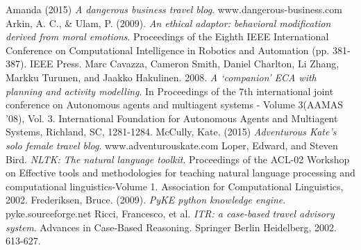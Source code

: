 \documentclass[11pt]{article} %
\begin{document}
\begin{thebibliography}{9}

Amanda (2015) \emph{A dangerous business travel blog}. www.dangerous-business.com
Arkin, A. C., \& Ulam, P. (2009). \emph{An ethical adaptor: behavioral modification derived from moral emotions}. Proceedings of the Eighth IEEE International Conference on Computational Intelligence in Robotics and Automation (pp. 381-387). IEEE Press.
Marc Cavazza, Cameron Smith, Daniel Charlton, Li Zhang, Markku Turunen, and Jaakko Hakulinen. 2008. \emph{A `companion' ECA with planning and activity modelling}. In Proceedings of the 7th international joint conference on Autonomous agents and multiagent systems - Volume 3(AAMAS '08), Vol. 3. International Foundation for Autonomous Agents and Multiagent Systems, Richland, SC, 1281-1284.
McCully, Kate. (2015) \emph{Adventurous Kate's solo female travel blog}. www.adventurouskate.com
Loper, Edward, and Steven Bird. \emph{NLTK: The natural language toolkit}. Proceedings of the ACL-02 Workshop on Effective tools and methodologies for teaching natural language processing and computational linguistics-Volume 1. Association for Computational Linguistics, 2002.
Frederiksen, Bruce. (2009). \emph{PyKE python knowledge engine}. pyke.sourceforge.net
Ricci, Francesco, et al. \emph{ITR: a case-based travel advisory system}. Advances in Case-Based Reasoning. Springer Berlin Heidelberg, 2002. 613-627.


\end{thebibliography}
\end{document}
